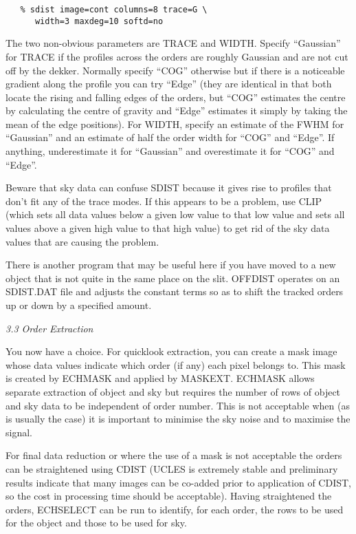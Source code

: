 \begin{verbatim}
   % sdist image=cont columns=8 trace=G \
      width=3 maxdeg=10 softd=no
\end{verbatim}

The two non-obvious parameters are TRACE and WIDTH. Specify ``Gaussian'' for
TRACE if the profiles across the orders are roughly Gaussian and are not cut
off by the dekker. Normally specify ``COG'' otherwise but if there is a
noticeable gradient along the profile you can try ``Edge'' (they are identical
in that both locate the rising and falling edges of the orders, but ``COG''
estimates
the centre by calculating the centre of gravity and ``Edge'' estimates
it simply by taking the mean of the edge positions). For WIDTH, specify an
estimate of the FWHM for ``Gaussian''
and an estimate of half the order width for
``COG'' and ``Edge''. If anything, underestimate
it for ``Gaussian'' and overestimate
it for ``COG'' and ``Edge''.

Beware that sky data can confuse SDIST because it gives rise to profiles that
don't fit any of the trace modes. If this appears to be a problem, use CLIP
(which sets all data values below a given low value to that low value and sets
all values above a given high value to that high value) to get rid of the
sky data values that are causing the problem.

There is another program that may be useful here if you have moved to a new
object that is not quite in the same place on the slit. OFFDIST operates on an
SDIST.DAT file and adjusts the constant terms so as to shift the tracked orders
up or down by a specified amount.


\goodbreak
\vspace{12pt}
{\it 3.3 Order Extraction}

You now have a choice. For quicklook extraction, you can create a mask image
whose data values indicate which order (if any) each pixel belongs to. This
mask is created by ECHMASK and applied by MASKEXT. ECHMASK allows separate
extraction of object and sky but requires the number of rows of object and sky
data to be independent of order number. This is not acceptable when (as is
usually the case) it is important to minimise the sky noise and to maximise the
signal.

For final data reduction or where the use of a mask is not acceptable the
orders can be straightened using CDIST (UCLES is extremely stable and
preliminary results indicate that many images can be co-added prior to
application of CDIST, so the cost in processing time should be acceptable).
Having straightened the orders,
ECHSELECT can be run to identify, for each
order, the rows to be used for the object and those to be used for sky.


